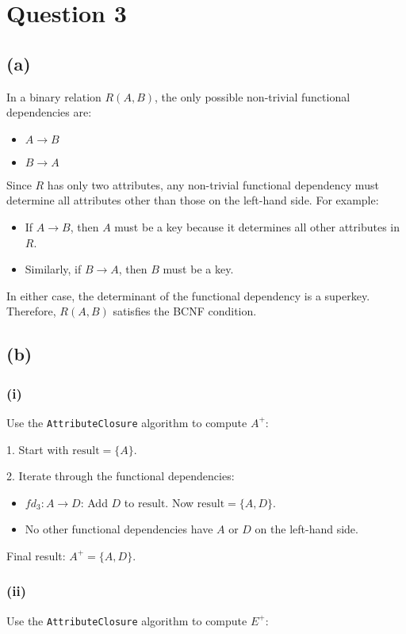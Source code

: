 \documentclass{article}
\begin{document}
\section*{Question 3}
\subsection*{(a)}
In a binary relation $R(A,B)$, the only possible non-trivial functional dependencies are:
\begin{itemize}
  \item $ A \rightarrow B $
  \item $ B \rightarrow A $
\end{itemize}
Since $ R $ has only two attributes, any non-trivial functional dependency must determine all attributes other than those on the left-hand side. For example:
\begin{itemize}
  \item If $ A \to B $, then $ A $ must be a key because it determines all other attributes in $ R $.
  \item Similarly, if $ B \to A $, then $ B $ must be a key.
\end{itemize}

In either case, the determinant of the functional dependency is a superkey. Therefore, $ R(A, B) $ satisfies the BCNF condition.

\subsection*{(b)}
\subsubsection*{(i)}
Use the \texttt{AttributeClosure} algorithm to compute $ A^+ $:

1. Start with $ \text{result} = \{A\} $.

2. Iterate through the functional dependencies:
\begin{itemize}
  \item $ fd_3: A \to D $: Add $ D $ to $ \text{result} $. Now $ \text{result} = \{A, D\} $.
  \item No other functional dependencies have $ A $ or $ D $ on the left-hand side.

\end{itemize}
Final result: $ A^+ = \{A, D\} $.

\subsubsection*{(ii)}
Use the \texttt{AttributeClosure} algorithm to compute $ E^+ $:
\end{document}
